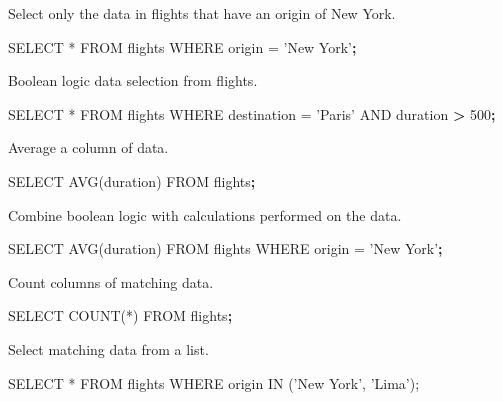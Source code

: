 \documentclass[]{book}
\newenvironment{Shaded}{\begin{snugshade}}{\end{snugshade}}
\newcommand{\KeywordTok}[1]{\textcolor[rgb]{0.13,0.29,0.53}{\textbf{#1}}}
\newcommand{\StringTok}[1]{\textcolor[rgb]{0.31,0.60,0.02}{#1}}
\newcommand{\OperatorTok}[1]{\textcolor[rgb]{0.81,0.36,0.00}{\textbf{#1}}}
\newcommand{\ExtensionTok}[1]{#1}
\newcommand{\NormalTok}[1]{#1}
\begin{document}
Select only the data in flights that have an origin of New York.

\begin{Shaded}
\begin{Highlighting}[]
\ExtensionTok{SELECT}\NormalTok{ * FROM flights WHERE origin = }\StringTok{'New York'}\KeywordTok{;}
\end{Highlighting}
\end{Shaded}

Boolean logic data selection from flights.

\begin{Shaded}
\begin{Highlighting}[]
\ExtensionTok{SELECT}\NormalTok{ * FROM flights WHERE destination = }\StringTok{'Paris'}\NormalTok{ AND duration }\OperatorTok{>}\NormalTok{ 500}\KeywordTok{;}
\end{Highlighting}
\end{Shaded}

Average a column of data.

\begin{Shaded}
\begin{Highlighting}[]
\ExtensionTok{SELECT}\NormalTok{ AVG(duration) }\ExtensionTok{FROM}\NormalTok{ flights}\KeywordTok{;}
\end{Highlighting}
\end{Shaded}

Combine boolean logic with calculations performed on the data.

\begin{Shaded}
\begin{Highlighting}[]
\ExtensionTok{SELECT}\NormalTok{ AVG(duration) }\ExtensionTok{FROM}\NormalTok{ flights WHERE origin = }\StringTok{'New York'}\KeywordTok{;}
\end{Highlighting}
\end{Shaded}

Count columns of matching data.

\begin{Shaded}
\begin{Highlighting}[]
\ExtensionTok{SELECT}\NormalTok{ COUNT(*) }\ExtensionTok{FROM}\NormalTok{ flights}\KeywordTok{;}
\end{Highlighting}
\end{Shaded}

Select matching data from a list.

\begin{Shaded}
\begin{Highlighting}[]
\ExtensionTok{SELECT}\NormalTok{ * FROM flights WHERE origin IN (}\StringTok{'New York'}\NormalTok{, }\StringTok{'Lima'}\NormalTok{);}
\end{Highlighting}
\end{Shaded}
\end{document}
